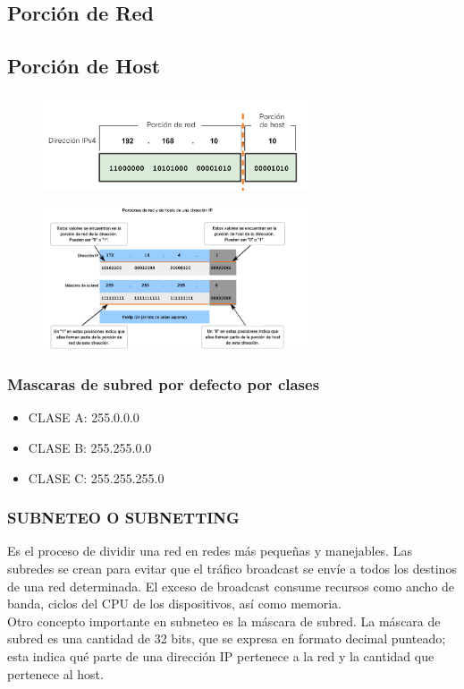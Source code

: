 \documentclass[letterpaper,12pt]{article}
\begin{document}
\begin{sloppypar}
\subsection{Porción de Red}
\subsection{Porción de Host}

\begin{figure}[H]
    \centering 
    \includegraphics[width=0.7\textwidth]{redesss2.png}
\end{figure}
\begin{figure}[H]
    \centering 
    \includegraphics[width=0.7\textwidth]{redes3.png}
\end{figure}

\subsubsection{Mascaras de subred por defecto por clases}
\begin{itemize}
    \item CLASE A: 255.0.0.0
    \item CLASE B: 255.255.0.0
    \item CLASE C: 255.255.255.0
\end{itemize}

\subsubsection{SUBNETEO O SUBNETTING}
Es el proceso de dividir una red en redes más pequeñas y manejables. Las subredes se crean para evitar que el tráfico broadcast se envíe a todos los destinos de una red determinada. El exceso de broadcast consume recursos como ancho de banda, ciclos del CPU de los dispositivos, así como memoria.
\vspace{0.3cm}\\ 
Otro concepto importante en subneteo es la máscara de subred. La máscara de subred es una cantidad de 32 bits, que se expresa en formato decimal punteado; esta indica qué parte de una dirección IP pertenece a la red y la cantidad que pertenece al host.


\end{sloppypar}
\end{document}
